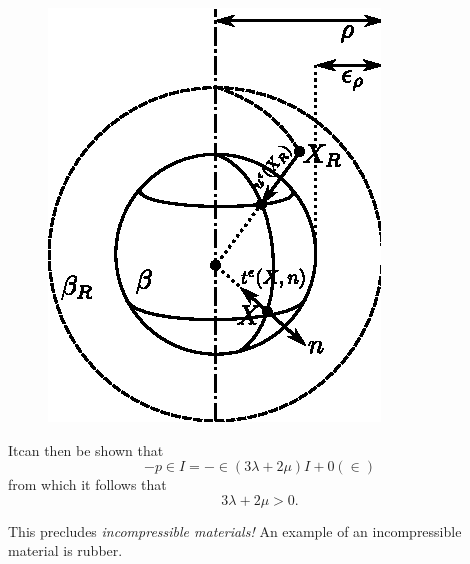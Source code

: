 \begin{figure}[H]
\centering
\includegraphics{vol71-figures/fig1.3-4.eps}
\medskip
\caption{}\label{fig1.3.4}
\end{figure}

It\pageoriginale can then be shown that 
\begin{equation*}
- p \in I = - \in (3 \lambda + 2\mu) I + 0(\in)\tag{1.3-37}\label{eq1.3-37}
\end{equation*}
from which it follows that
\begin{equation*}
3\lambda + 2\mu > 0. \tag{1.3-38}\label{eq1.3-38}
\end{equation*}

\begin{remark}\label{chap1-rem1.3.5}%
  This precludes {\em{incompressible materials!}} An example of an 
  incompressible material is rubber.
\end{remark}

